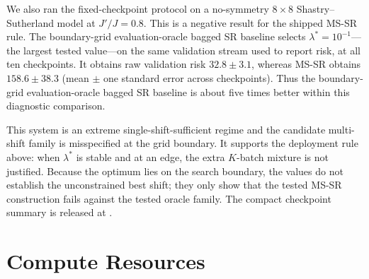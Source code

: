 We also ran the fixed-checkpoint protocol on a no-symmetry $8\times8$
Shastry--Sutherland model at $J'/J=0.8$. This is a negative result for the
shipped MS-SR rule. The boundary-grid evaluation-oracle bagged SR baseline
selects $\lambda^*=10^{-1}$---the largest tested value---on the same validation
stream used to report risk, at all ten checkpoints. It obtains raw validation
risk $32.8\mathbin{\pm}3.1$, whereas MS-SR obtains
$158.6\mathbin{\pm}38.3$ (mean $\mathbin{\pm}$ one standard error across
checkpoints). Thus the boundary-grid evaluation-oracle bagged SR baseline is
about five times better within this diagnostic comparison.

This system is an extreme single-shift-sufficient regime and the candidate
multi-shift family is misspecified at the grid boundary. It supports the
deployment rule above: when $\lambda^*$ is stable and at an edge, the extra
$K$-batch mixture is not justified. Because the optimum lies on the search
boundary, the values do not establish the unconstrained best shift; they only
show that the tested MS-SR construction fails against the tested oracle family.
The compact checkpoint summary is released at
.

\section{Compute Resources}\label{app:compute}


